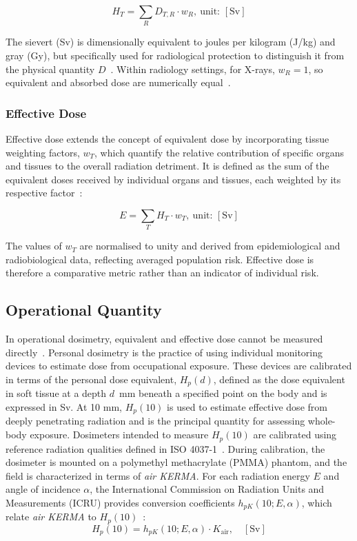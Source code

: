 \begin{equation}
H_T = \sum_R D_{T,R} \cdot w_R,\ \text{unit: } [\mathrm{Sv}]
\label{eq:equivalent_dose}
\end{equation}
 
\noindent The sievert (Sv) is dimensionally equivalent to joules per kilogram (J/kg) and gray (Gy), but specifically used for radiological protection to distinguish it from the physical quantity $D$~\cite{6}. Within radiology settings, for X-rays, $w_R = 1$, so equivalent and absorbed dose are numerically equal~\cite{15}.

\subsubsection{Effective Dose}
Effective dose extends the concept of equivalent dose by incorporating tissue weighting factors, $w_T$, which quantify the relative contribution of specific organs and tissues to the overall radiation detriment. It is defined as the sum of the equivalent doses received by individual organs and tissues, each weighted by its respective factor~\cite{6,13,14}:
 
\begin{equation}
E = \sum_T H_T \cdot w_T,\ \text{unit: } [\mathrm{Sv}]
\label{eq:effective_dose}
\end{equation}
 
\noindent The values of $w_T$ are normalised to unity and derived from epidemiological and radiobiological data, reflecting averaged population risk. Effective dose is therefore a comparative metric rather than an indicator of individual risk. 

\subsection{Operational Quantity}
In operational dosimetry, equivalent and effective dose cannot be measured directly~\cite{13}. Personal dosimetry is the practice of using individual monitoring devices to estimate dose from occupational exposure. These devices are calibrated in terms of the personal dose equivalent, $H_p(d)$, defined as the dose equivalent in soft tissue at a depth $d$~mm beneath a specified point on the body and is expressed in Sv. At 10 mm, $H_p(10)$ is used to estimate effective dose from deeply penetrating radiation and is the principal quantity for assessing whole-body exposure. Dosimeters intended to measure $H_p(10)$ are calibrated using reference radiation qualities defined in ISO 4037-1~\cite{113}. During calibration, the dosimeter is mounted on a polymethyl methacrylate (PMMA) phantom, and the field is characterized in terms of \emph{air KERMA}. For each radiation energy $E$ and angle of incidence $\alpha$, the International Commission on Radiation Units and Measurements (ICRU) provides conversion coefficients $h_{pK}(10; E, \alpha)$, which relate \emph{air KERMA} to $H_p(10)$~\cite{ISO3}:
\begin{equation}
H_p(10) = h_{pK}(10; E, \alpha)\cdot K_{\mathrm{air}}, \quad [\mathrm{Sv}]
\label{eq:hp10}
\end{equation}

